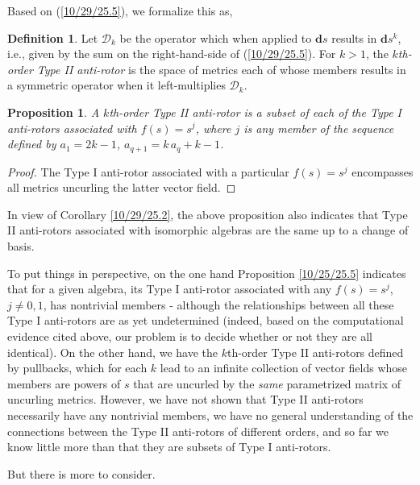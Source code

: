 \documentclass{amsart}
\newtheorem{proposition}[theorem]{Proposition}
\theoremstyle{definition}
\newtheorem{definition}[theorem]{Definition}
\numberwithin{theorem}{section}
\numberwithin{equation}{section}
\begin{document}
 Based on (\ref{10/29/25.5}), we formalize this as,
\begin{definition}\label{10/29/25.3} Let $\mathcal{D}_k$ be the operator which when applied to $\mathbf{d}s$ results in $\mathbf{d}s^k$, i.e., given by the sum on the right-hand-side of (\ref{10/29/25.5}).   For $k>1$, the {\it $k$th-order Type II anti-rotor} is the space of metrics each of whose members results in a symmetric operator when it left-multiplies $\mathcal{D}_k$.\end{definition}

\begin{proposition}\label{10/29/25.4} A $k$th-order Type II anti-rotor is a subset of each of the Type I anti-rotors associated with $f(s)=s^j$, where $j$ is any member of the sequence defined by $a_1=2k-1$, $a_{q+1} = k\, a_q +k-1$. \end{proposition}
\begin{proof} The Type I anti-rotor associated with a particular $f(s)=s^j$ encompasses all metrics uncurling the latter vector field.\end{proof} 

In view of Corollary \ref{10/29/25.2}, the above proposition also indicates that Type II anti-rotors associated with isomorphic algebras are the same up to a change of basis.

To put things in perspective, on the one hand Proposition \ref{10/25/25.5} indicates that for a given algebra, its Type I anti-rotor associated with any $f(s)=s^j$, $j\ne 0,1$, has nontrivial members - although the relationships between all these Type I anti-rotors are as yet undetermined (indeed, based on the computational evidence cited above, our problem is to decide whether or not they are all identical).  On the other hand, we have the $k$th-order Type II anti-rotors defined by pullbacks, which for each $k$ lead to an infinite collection of vector fields whose members are powers of $s$ that are uncurled by the {\it same} parametrized matrix of uncurling metrics.  However, we have not shown that Type II anti-rotors necessarily have any nontrivial members, we have no general understanding of the connections between the Type II anti-rotors of different orders, and so far we know little more than that they are subsets of Type I anti-rotors.

But there is more to consider.
\end{document}
